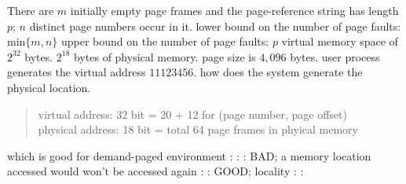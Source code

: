 \documentclass{myart}
\begin{document}
\w There are $m$ initially empty page frames and the page-reference
	string has length $p$; $n$ distinct page numbers occur in it.
	\bit
	\w lower bound on the number of page faults:
	min$\{m, n\}$
	\w upper bound on the number of page faults: $p$
	\eit
\w virtual memory space of $2^{32}$ bytes. $2^{18}$ bytes of 
	physical memory.
	page size is $4,096$ bytes. user process generates
	the virtual address $11123456$. how does the system generate
	the physical location.
	\begin{quote}
	virtual address: 32 bit = 20 + 12 for (page number, page offset)\\
	physical address: 18 bit = total 64 page frames in phyical memory
	\end{quote}
\w which is good for demand-paged environment
	\bit
	\w {}:	
	\w {}: 
	\w {}: BAD; a memory location accessed would
		won't be accessed again
	\w {}:
	\w {}: GOOD; locality
	\w {}:
	\w {}:
	\eit
\eit
\end{document}
